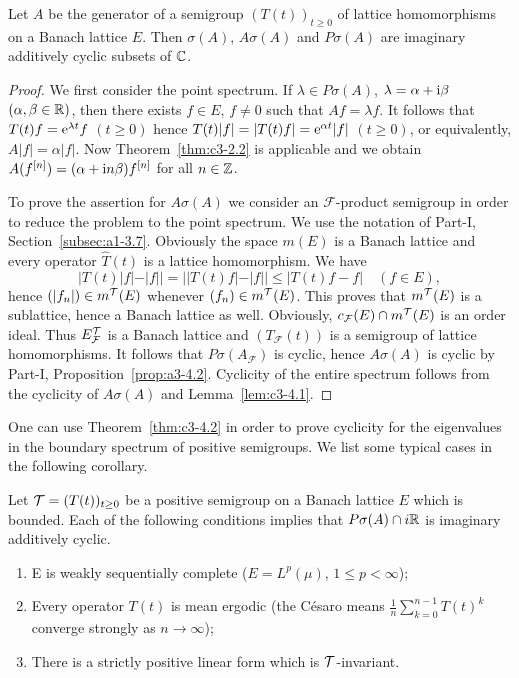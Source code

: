 \begin{theorem}\label{thm:c3-4.2}
	Let $A$ be the generator of a semigroup $(T(t))_{t \geq 0}$ of lattice homomorphisms on a Banach lattice $E$. 
	Then $\sigma(A)$, $A\sigma(A)$ and $P\sigma(A)$ are imaginary additively cyclic subsets of\/ $\mathbb{C} $.
\end{theorem}
\begin{proof}
	We first consider the point spectrum. 
	If\/ $\lambda \in P\sigma(A)$, $\lambda = \alpha + \mathrm{i}\beta$ $(\alpha,\beta \in \mathbb{R} )$, then there exists $f \in E$, $f \neq 0$ such that $Af = \lambda f$. 
	It follows that $T(t)f = \mathrm{e}^{\lambda t}f$ $(t \geq 0)$ hence $T(t)|f| = |T(t)f| = \mathrm{e}^{\alpha t}|f|$ $(t \geq 0)$, or equivalently, $A|f| = \alpha|f|$. 
	Now Theorem~\ref{thm:c3-2.2} is applicable and we obtain $A(f^{[n]}) = (\alpha + \mathrm{i} n\beta)f^{[n]}$ for all $n \in \mathbb{Z}$.
	
	To prove the assertion for $A\sigma(A)$ we consider an $\mathcal{F}$-product semigroup%
    in order to reduce the problem to the point spectrum. 
	We use the notation of Part-I, Section~\ref{subsec:a1-3.7}. 
	Obviously the space $m(E)$ is a Banach lattice and every operator $\hat{T}(t)$ is a lattice homomorphism. 
	We have %
\[
	|T(t)|f| - |f|| = ||T(t)f| - |f|| \leq |T(t)f - f| \quad (f \in E) ,
\]
%
hence $(|f_{n}|) \in m^{\mathcal{T}}(E)$ whenever $(f_{n}) \in m^{\mathcal{T}}(E)$. 
	This proves that $m^{\mathcal{T}}(E)$ is a sublattice, hence a Banach lattice as well. 
	Obviously, $c_{\mathcal{F}}(E)\cap m^{\mathcal{T}}(E)$ is an order ideal. 
	Thus $E_{\mathcal{F}}^{\mathcal{T}}$ is a Banach lattice and $(T_{\mathcal{F}}(t))$ is a semigroup of lattice homomorphisms. 
	It follows that $P\sigma(A_{\mathcal{F}})$ is cyclic, hence $A\sigma(A)$ is cyclic by Part-I, Proposition~\ref{prop:a3-4.2}.
Cyclicity of the entire spectrum follows from the cyclicity of\/ $A\sigma(A)$ and Lemma~\ref{lem:c3-4.1}.
\end{proof}
One can use Theorem~\ref{thm:c3-4.2} in order to prove cyclicity for the eigenvalues in the boundary spectrum of positive semigroups. 
We list some typical cases in the following corollary.
\begin{corollary}\label{cor:c3-4.3}
	Let $\TT = (T(t))_{t \geq 0}$ be a positive semigroup on a Banach lattice $E$ which is bounded. 
	Each of the following conditions implies that $P\sigma(A)\cap i\mathbb{R} $ is imaginary additively cyclic.
	\begin{enumerate}[\upshape (i)]
		\item E is weakly sequentially complete (\eg $E = L^{p}(\mu)$, $1 \leq p < \infty$);
		\item Every operator $T(t)$ is mean ergodic (\ie the Césaro means $\frac{1}{n}\sum_{k=0}^{n-1}T(t)^{k}$ converge strongly as $n \to  \infty$);
		\item There is a strictly positive linear form which is $\mathcal{T}$-invariant.
	\end{enumerate}
\end{corollary}
